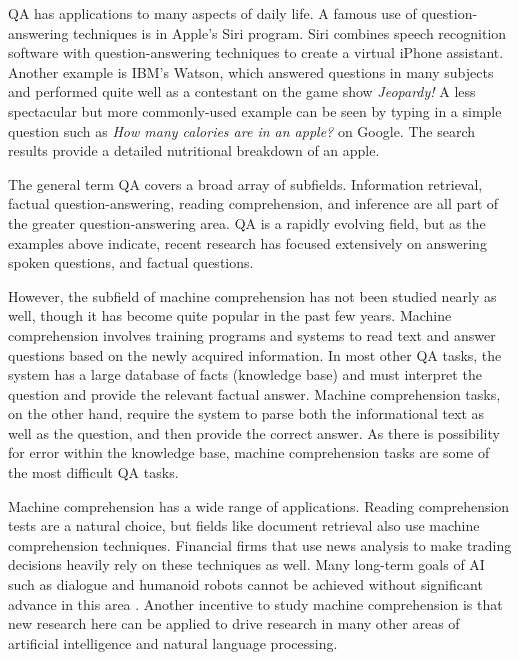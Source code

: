 \documentclass[pageno]{final_paper}
\begin{document}
QA has applications to many aspects of daily life. A famous use of
question-answering techniques is in Apple's Siri program. Siri combines speech
recognition software with question-answering techniques to create a virtual
iPhone assistant. Another example is IBM's Watson, which answered questions in
many subjects and performed quite well as a contestant on the game show
\textit{Jeopardy!} A less spectacular but more commonly-used example can be seen
by typing in a simple question such as \textit{How many calories are in an
apple?} on Google. The search results provide a detailed nutritional breakdown
of an apple.

The general term QA covers a broad array of subfields. Information retrieval,
factual question-answering, reading comprehension, and inference are all part
of the greater question-answering area. QA is a rapidly evolving field, but as
the examples above indicate, recent research has focused extensively on
answering spoken questions, and factual questions.

However, the subfield of machine comprehension has not been studied nearly as
well, though it has become quite popular in the past few years. Machine
comprehension involves training programs and systems to read text and answer
questions based on the newly acquired information. In most other QA tasks, the
system has a large database of facts (knowledge base) and must interpret the
question and provide the relevant factual answer. Machine comprehension tasks,
on the other hand, require the system to parse both the informational text as
well as the question, and then provide the correct answer. As there is
possibility for error within the knowledge base, machine comprehension tasks
are some of the most difficult QA tasks.

Machine comprehension has a wide range of applications. Reading comprehension
tests are a natural choice, but fields like document retrieval also use machine
comprehension techniques. Financial firms that use news analysis to make
trading decisions heavily rely on these techniques as well. Many long-term
goals of AI such as dialogue and humanoid robots cannot be achieved without
significant advance in this area \cite{Weston2015}. Another incentive to
study machine comprehension is that new research here can be applied to drive
research in many other areas of artificial intelligence and natural language
processing.
\end{document}
